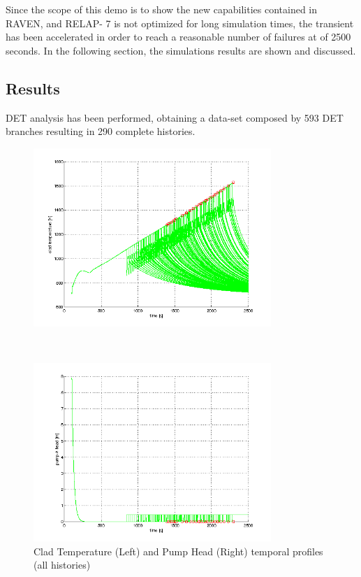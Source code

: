 Since the scope of this demo is to show the new capabilities contained in RAVEN, and RELAP-
7 is not optimized for long simulation times, the transient has been accelerated in order to reach a reasonable number of failures at of 2500 seconds.  In the following section, the simulations results are shown and discussed.
\subsection{Results} 
DET analysis has been performed, obtaining a data-set composed by 593 DET branches resulting in 290 complete histories.

\begin{figure}
 \begin{minipage}[b]{8.5cm}
   \centering
   \includegraphics[width=9cm]{figures/CladTemperature.png}
 \end{minipage}
 \ \hspace{2mm} \hspace{3mm} \
 \begin{minipage}[b]{8.5cm}
   \centering
   \includegraphics[width=9cm]{figures/HeadPump.png}
 \end{minipage}
\caption{Clad Temperature (Left) and Pump Head (Right) temporal profiles (all histories)}
\label{fig:ESBPall}
\end{figure}
\vspace{-5mm}

